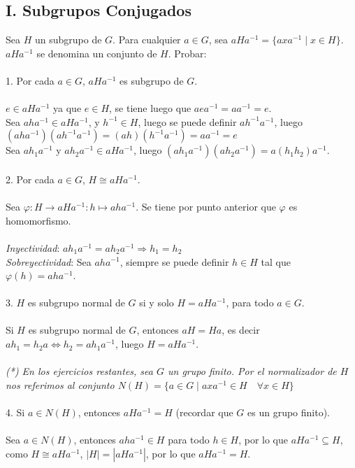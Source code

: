 \documentclass{article}
\begin{document}
\subsection*{I. Subgrupos Conjugados}
Sea $H$ un subgrupo de $G$. Para cualquier $a \in G$, sea $aHa^{-1}=\{axa^{-1} \mid x \in H \}$. $aHa^{-1}$ se denomina un conjunto de $H$. Probar:
\\
\\
1. Por cada $a \in G$, $aHa^{-1}$ es subgrupo de $G$.
\\
\\
$e \in aHa^{-1}$ ya que $e \in H$, se tiene luego que $aea^{-1}=aa^{-1}=e$.
\\
Sea $aha^{-1} \in aHa^{-1}$, y $h^{-1} \in H$, luego se puede definir $ah^{-1}a^{-1}$, luego $(aha^{-1})(ah^{-1}a^{-1})=(ah)(h^{-1}a^{-1})=aa^{-1}=e$
\\
Sea $ah_{1}a^{-1}$ y $ah_{2}a^{-1} \in aHa^{-1}$, luego $(ah_{1}a^{-1})(ah_{2}a^{-1})=a(h_1h_2)a^{-1}$.
\\
\\
2. Por cada $a \in G$, $H \cong aHa^{-1}$.
\\
\\
Sea $\varphi:H \to aHa^{-1}: h \mapsto aha^{-1}$. Se tiene por punto anterior que $\varphi$ es homomorfismo.
\\
\\
\textit{Inyectividad}: $ah_{1}a^{-1}=ah_{2}a^{-1} \Longrightarrow h_{1}=h_{2}$
\\
\textit{Sobreyectividad}: Sea $aha^{-1}$, siempre se puede definir $h \in H$ tal que $\varphi(h)=aha^{-1}$.
\\
\\
3. $H$ es subgrupo normal de $G$ si y solo $H=aHa^{-1}$, para todo $a \in G$.
\\
\\
Si $H$ es subgrupo normal de $G$, entonces $aH=Ha$, es decir $ah_{1}=h_{2}a \Longleftrightarrow h_{2}=ah_{1}a^{-1}$, luego $H=aHa^{-1}$.
\\
\\
\textit{(*) En los ejercicios restantes, sea $G$ un grupo finito. Por el normalizador de $H$ nos referimos al conjunto $N(H)= \{ a \in G \mid axa^{-1} \in H \quad \forall x \in H \}$}
\\
\\
4. Si $a \in N(H)$, entonces $aHa^{-1}=H$ (recordar que $G$ es un grupo finito).
\\
\\
Sea $a \in N(H)$, entonces $aha^{-1} \in H$ para todo $h \in H$, por lo que $aHa^{-1} \subseteq H$, como $H \cong aHa^{-1}$, $|H| = |aHa^{-1}|$, por lo que $aHa^{-1}=H$.
\end{document}
